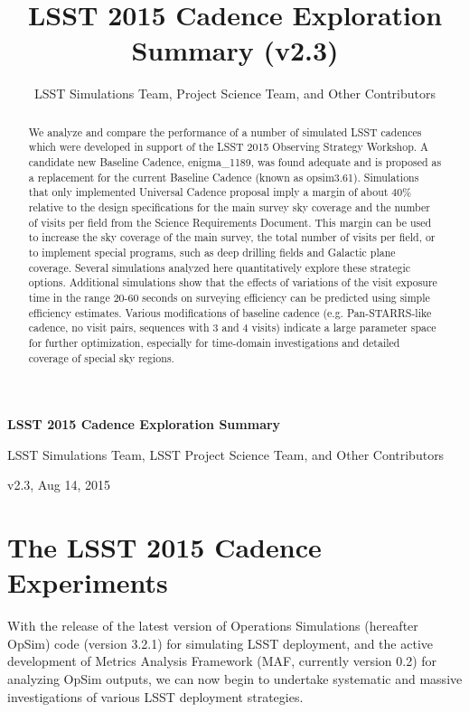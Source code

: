 \documentclass[manuscript]{article}
\begin{document}
\title{LSST 2015 Cadence Exploration Summary (v2.3)}
\author{LSST Simulations Team, Project Science Team, and Other Contributors} 


\centerline{\bf \Large  LSST 2015 Cadence Exploration Summary}
\vskip 0.2in
\centerline{LSST Simulations Team, LSST Project Science Team, and Other Contributors}
\vskip 0.1in
\centerline{v2.3, Aug 14, 2015}

\begin{abstract}
We analyze and compare the performance of a number of simulated LSST 
cadences which were developed in support of the LSST 2015 Observing Strategy Workshop. 
A candidate new Baseline Cadence, enigma\_1189, was found adequate and is proposed as 
a replacement for the current Baseline Cadence (known as opsim3.61).
Simulations that only implemented Universal Cadence proposal imply a margin of about 
40\% relative to the design specifications for the main survey sky coverage and the number of 
visits per field from the Science Requirements Document. This margin can be used to increase
the sky coverage of the main survey, the total number of visits per field, or to implement
special programs, such as deep drilling fields and Galactic plane coverage. Several 
simulations analyzed here quantitatively explore these strategic options. 
Additional simulations show that the effects of variations of the visit exposure time in the 
range 20-60 seconds on surveying efficiency can be predicted using simple efficiency 
estimates. Various modifications of baseline cadence (e.g. Pan-STARRS-like cadence, 
no visit pairs, sequences with 3 and 4 visits) indicate a large parameter space for further
optimization, especially for time-domain investigations and detailed coverage of special
sky regions. 
\end{abstract}







\section{The LSST 2015 Cadence Experiments} 

With the release of the latest version of Operations Simulations (hereafter OpSim) code (version 3.2.1) 
for simulating LSST deployment, and the active development of Metrics Analysis Framework (MAF, 
currently version 0.2) for analyzing OpSim outputs, we can now begin to undertake systematic and 
massive investigations of various LSST deployment strategies. 
\end{document}
